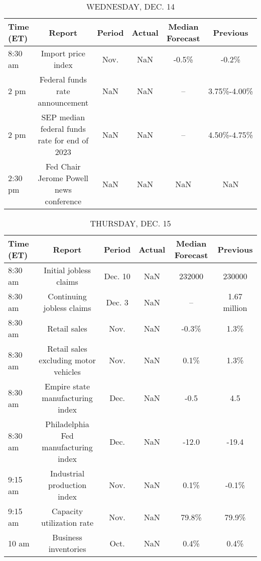 \documentclass{article}%
\begin{document}
%


\begin{table}[htbp]%
\caption{WEDNESDAY, DEC. 14}%
\centering%
\begin{adjustbox}{width=1\textwidth}%
\begin{tabular}{lccccc}
\toprule
Time (ET) &                                        Report & Period & Actual & Median Forecast &    Previous \\
\midrule
  8:30 am &                            Import price index &   Nov. &    NaN &           -0.5\% &       -0.2\% \\
     2 pm &               Federal funds rate announcement &    NaN &    NaN &              -- & 3.75\%-4.00\% \\
     2 pm & SEP median federal funds rate for end of 2023 &    NaN &    NaN &              -- & 4.50\%-4.75\% \\
  2:30 pm &       Fed Chair Jerome Powell news conference &    NaN &    NaN &             NaN &         NaN \\
\bottomrule
\end{tabular}
%
\end{adjustbox}%
\end{table}

%


\begin{table}[htbp]%
\caption{THURSDAY, DEC. 15}%
\centering%
\begin{adjustbox}{width=1\textwidth}%
\begin{tabular}{lccccc}
\toprule
Time (ET) &                                Report &  Period & Actual & Median Forecast &     Previous \\
\midrule
  8:30 am &                Initial jobless claims & Dec. 10 &    NaN &          232000 &       230000 \\
  8:30 am &             Continuing jobless claims &  Dec. 3 &    NaN &              -- & 1.67 million \\
  8:30 am &                          Retail sales &    Nov. &    NaN &           -0.3\% &         1.3\% \\
  8:30 am & Retail sales excluding motor vehicles &    Nov. &    NaN &            0.1\% &         1.3\% \\
  8:30 am &      Empire state manufacturing index &    Dec. &    NaN &            -0.5 &          4.5 \\
  8:30 am &  Philadelphia Fed manufacturing index &    Dec. &    NaN &           -12.0 &        -19.4 \\
  9:15 am &           Industrial production index &    Nov. &    NaN &            0.1\% &        -0.1\% \\
  9:15 am &             Capacity utilization rate &    Nov. &    NaN &           79.8\% &        79.9\% \\
    10 am &                  Business inventories &    Oct. &    NaN &            0.4\% &         0.4\% \\
\bottomrule
\end{tabular}
%
\end{adjustbox}%
\end{table}
\end{document}
